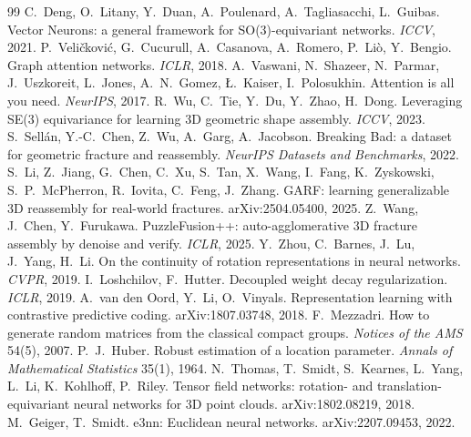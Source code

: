 \documentclass[11pt,a4paper]{article}
\theoremstyle{remark}
\begin{document}
\begin{thebibliography}{99}
\small
{} C.~Deng, O.~Litany, Y.~Duan, A.~Poulenard, A.~Tagliasacchi, L.~Guibas. Vector Neurons: a general framework for SO(3)-equivariant networks. \emph{ICCV}, 2021.
 P.~Veli\v{c}kovi\'c, G.~Cucurull, A.~Casanova, A.~Romero, P.~Li\`o, Y.~Bengio. Graph attention networks. \emph{ICLR}, 2018.
 A.~Vaswani, N.~Shazeer, N.~Parmar, J.~Uszkoreit, L.~Jones, A.~N.~Gomez, \L.~Kaiser, I.~Polosukhin. Attention is all you need. \emph{NeurIPS}, 2017.
 R.~Wu, C.~Tie, Y.~Du, Y.~Zhao, H.~Dong. Leveraging SE(3) equivariance for learning 3D geometric shape assembly. \emph{ICCV}, 2023.
 S.~Sell\'an, Y.-C.~Chen, Z.~Wu, A.~Garg, A.~Jacobson. Breaking Bad: a dataset for geometric fracture and reassembly. \emph{NeurIPS Datasets and Benchmarks}, 2022.
 S.~Li, Z.~Jiang, G.~Chen, C.~Xu, S.~Tan, X.~Wang, I.~Fang, K.~Zyskowski, S.~P.~McPherron, R.~Iovita, C.~Feng, J.~Zhang. GARF: learning generalizable 3D reassembly for real-world fractures. arXiv:2504.05400, 2025.
 Z.~Wang, J.~Chen, Y.~Furukawa. PuzzleFusion++: auto-agglomerative 3D fracture assembly by denoise and verify. \emph{ICLR}, 2025.
 Y.~Zhou, C.~Barnes, J.~Lu, J.~Yang, H.~Li. On the continuity of rotation representations in neural networks. \emph{CVPR}, 2019.
 I.~Loshchilov, F.~Hutter. Decoupled weight decay regularization. \emph{ICLR}, 2019.
 A.~van den Oord, Y.~Li, O.~Vinyals. Representation learning with contrastive predictive coding. arXiv:1807.03748, 2018.
 F.~Mezzadri. How to generate random matrices from the classical compact groups. \emph{Notices of the AMS} 54(5), 2007.
 P.~J.~Huber. Robust estimation of a location parameter. \emph{Annals of Mathematical Statistics} 35(1), 1964.
 N.~Thomas, T.~Smidt, S.~Kearnes, L.~Yang, L.~Li, K.~Kohlhoff, P.~Riley. Tensor field networks: rotation- and translation-equivariant neural networks for 3D point clouds. arXiv:1802.08219, 2018.
 M.~Geiger, T.~Smidt. e3nn: Euclidean neural networks. arXiv:2207.09453, 2022.
\end{thebibliography}
\end{document}
